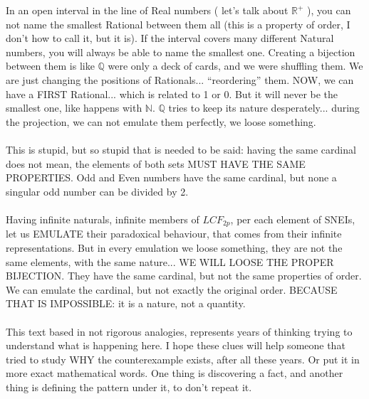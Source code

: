 		\noindent
		In an open interval in the line of Real numbers ( let's talk about $\mathbb{R}^{+}$ ), you can not name the smallest Rational between them all (this is a property of order, I don't how to call it, but it is). If the interval covers many different Natural numbers, you will always be able to name the smallest one. Creating a bijection between them is like $\mathbb{Q}$ were only a deck of cards, and we were shuffling them. We are just changing the positions of Rationals... ``reordering'' them. NOW, we can have a FIRST Rational... which is related to 1 or 0. But it will never be the smallest one, like happens with $\mathbb{N}$. $\mathbb{Q}$ tries to keep its nature desperately... during the projection, we can not emulate them perfectly, we loose something.
		\\\\
		
		\noindent
		This is stupid, but so stupid that is needed to be said: having the same cardinal does not mean, the elements of both sets MUST HAVE THE SAME PROPERTIES. Odd and Even numbers have the same cardinal, but none a singular odd number can be divided by 2.
		\\\\
		
		\noindent
		Having infinite naturals, infinite members of $LCF_{2p}$, per each element of SNEIs, let us EMULATE their paradoxical behaviour, that comes from their infinite representations. But in every emulation we loose something, they are not the same elements, with the same nature... WE WILL LOOSE THE PROPER BIJECTION. They have the same cardinal, but not the same properties of order. We can emulate the cardinal, but not exactly the original order. BECAUSE THAT IS IMPOSSIBLE: it is a nature, not a quantity.
		\\\\
		
		\noindent
		This text based in not rigorous analogies, represents years of thinking trying to understand what is happening here. I hope these clues will help someone that tried to study WHY the counterexample exists, after all these years. Or put it in more exact mathematical words. One thing is discovering a fact, and another thing is defining the pattern under it, to don't repeat it.
		\\\\
		
